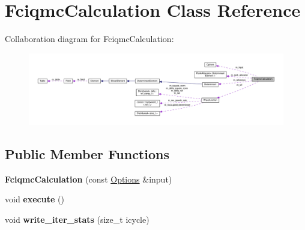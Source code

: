 \hypertarget{classFciqmcCalculation}{}\section{Fciqmc\+Calculation Class Reference}
\label{classFciqmcCalculation}


Collaboration diagram for Fciqmc\+Calculation\+:\nopagebreak
\begin{figure}[H]
\begin{center}
\leavevmode
\includegraphics[width=350pt]{classFciqmcCalculation__coll__graph}
\end{center}
\end{figure}
\subsection*{Public Member Functions}
\begin{DoxyCompactItemize}
\item 
{\bfseries Fciqmc\+Calculation} (const \hyperlink{structOptions}{Options} \&input)\hypertarget{classFciqmcCalculation_a7ad3b249a7b10c8a4e199f7b5b1cd3a6}{}\label{classFciqmcCalculation_a7ad3b249a7b10c8a4e199f7b5b1cd3a6}

\item 
void {\bfseries execute} ()\hypertarget{classFciqmcCalculation_a4dd7b05054552de32424ef19221f89db}{}\label{classFciqmcCalculation_a4dd7b05054552de32424ef19221f89db}

\item 
void {\bfseries write\+\_\+iter\+\_\+stats} (size\+\_\+t icycle)\hypertarget{classFciqmcCalculation_ae315657d8686933c407fa66d08997820}{}\label{classFciqmcCalculation_ae315657d8686933c407fa66d08997820}

\end{DoxyCompactItemize}
